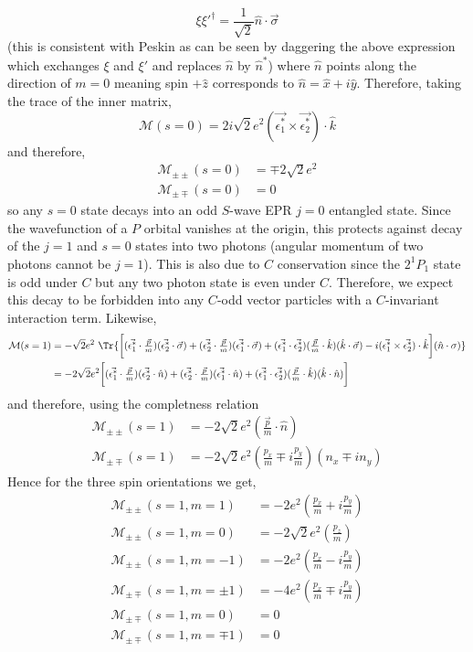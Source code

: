 \documentclass[12pt]{article}
\newcommand{\cM}{\mathcal{M}}
\begin{document}
\[ \xi \xi'^\dagger = \frac{1}{\sqrt{2}} \hat{n} \cdot \vec{\sigma} \]
(this is consistent with Peskin as can be seen by daggering the above expression which exchanges $\xi$ and $\xi'$ and replaces $\hat{n}$ by $\hat{n}^*$)
where $\hat{n}$ points along the direction of $m = 0$ meaning spin $+ \hat{z}$ corresponds to $\hat{n} = \hat{x} + i \hat{y}$. Therefore, taking the trace of the inner matrix,
\[ \cM(s = 0) = 2i  \sqrt{2} e^2 (\vec{\epsilon^*_1} \times \vec{\epsilon^*_2}) \cdot \hat{k} \]
and therefore,
\begin{align*}
\cM_{\pm \pm}(s = 0) &= \mp 2 \sqrt{2} e^2 
\\
\cM_{\pm \mp}(s = 0) &= 0 
\end{align*}
so any $s = 0$ state decays into an odd $S$-wave EPR $j = 0$ entangled state. Since the wavefunction of a $P$ orbital vanishes at the origin, this protects against decay of the $j = 1$ and $s = 0$ states into two photons (angular momentum of two photons cannot be $j = 1$). This is also due to $C$ conservation since the $2^{1} P_1$ state is odd under $C$ but any two photon state is even under $C$. Therefore, we expect this decay to be forbidden into any $C$-odd vector particles with a $C$-invariant interaction term. 
Likewise,
\begin{align*}
\cM(s = 1) &= -\sqrt{2} e^2 \, \, \Tr{\bigg[ (\vec{\epsilon_1^*} \cdot \tfrac{\vec{p}}{m}) (\vec{\epsilon^*_2} \cdot \vec{\sigma}) + (\vec{\epsilon_2^*} \cdot \tfrac{\vec{p}}{m}) (\vec{\epsilon^*_1} \cdot \vec{\sigma}) + (\vec{\epsilon_1^*} \cdot \vec{\epsilon_2^*})(\tfrac{\vec{p}}{m} \cdot \hat{k})(\hat{k} \cdot \vec{\sigma}) - i (\vec{\epsilon^*_1} \times \vec{\epsilon^*_2}) \cdot \hat{k} \bigg] (\hat{n} \cdot \sigma)}
\\
& = - 2 \sqrt{2} e^2 \bigg[ (\vec{\epsilon_1^*} \cdot \tfrac{\vec{p}}{m}) (\vec{\epsilon^*_2} \cdot \hat{n}) + (\vec{\epsilon_2^*} \cdot \tfrac{\vec{p}}{m}) (\vec{\epsilon^*_1} \cdot \hat{n}) + (\vec{\epsilon_1^*} \cdot \vec{\epsilon_2^*})(\tfrac{\vec{p}}{m} \cdot \hat{k})(\hat{k} \cdot \hat{n}) \bigg]
\end{align*}
and therefore, using the completness relation
\begin{align*}
\cM_{\pm \pm}(s = 1) &= - 2 \sqrt{2} e^2 (\tfrac{\vec{p}}{m} \cdot \hat{n})
\\
\cM_{\pm \mp}(s = 1) &= -2 \sqrt{2} e^2 (\tfrac{p_x}{m} \mp i \tfrac{p_y}{m})(n_x \mp i n_y)
\end{align*}
Hence for the three spin orientations we get,
\begin{align*}
\cM_{\pm \pm}(s = 1, m = 1) &= - 2 e^2 (\tfrac{p_x}{m} + i \tfrac{p_y}{m})
\\
\cM_{\pm \pm}(s = 1, m = 0) &= - 2 \sqrt{2} e^2 (\tfrac{p_z}{m})
\\
\cM_{\pm \pm}(s = 1, m = -1) &= - 2  e^2 (\tfrac{p_x}{m} - i \tfrac{p_y}{m})
\\
\cM_{\pm \mp}(s = 1, m = \pm 1) &= -4  e^2 (\tfrac{p_x}{m} \mp i \tfrac{p_y}{m})
\\
\cM_{\pm \mp}(s = 1, m = 0) &= 0
\\
\cM_{\pm \mp}(s = 1, m = \mp 1) &= 0
\end{align*}
\end{document}
